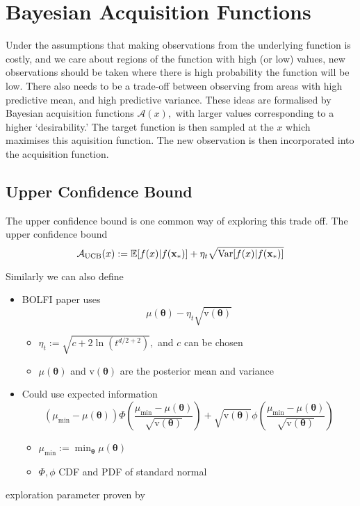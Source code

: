 \begin{figure}[htbp]
\end{figure}

\section{Bayesian Acquisition Functions}

Under the assumptions that making observations from the underlying function is
costly, and we care about regions of the function with high (or low)
values, new observations should be taken where there is high probability the
function will be low. There also needs to be a trade-off between observing from
areas with high predictive mean, and high predictive variance. These ideas are
formalised by Bayesian acquisition functions $\mathcal{A}(x),$ with larger 
values corresponding to a higher `desirability.' The target function is then 
sampled at the $x$ which maximises this aquisition function. The new 
observation is then incorporated into the acquisition function.

\subsection*{Upper Confidence Bound}

The upper confidence bound is one common way of exploring this trade off. The 
upper confidence bound
$$
    \mathcal{A}_\text{UCB}(x)
    := \operatorname{\mathbb{E}}[f(x) | f(\mathbf{x}_*)]
    + \eta_t \sqrt{\mathrm{Var}[f(x) | f(\mathbf{x}_*)]}
$$

Similarly we can also define 

\begin{itemize}
    \item BOLFI paper uses $$\mu(\bm\theta) - \eta_t\sqrt{\mathrm{v}(\bm\theta)}$$ \begin{itemize}
              \item $\eta_t:= \sqrt{c + 2\ln(t^{d/2 + 2})},$ and $c$ can be chosen
              \item $\mu(\bm\theta)$ and $\mathrm{v}(\bm\theta)$ are the posterior mean and variance
          \end{itemize}

    \item Could use expected information
          $$
              (\mu_\text{min} - \mu(\bm\theta)) \varPhi \left(
              \frac{\mu_\text{min} - \mu(\bm\theta)}{\sqrt{\mathrm{v}(\bm\theta)}}
              \right)
              + \sqrt{\mathrm{v}(\bm\theta)}\phi\left(
              \frac{\mu_\text{min} - \mu(\bm\theta)}{\sqrt{\mathrm{v}(\bm\theta)}}
              \right)
          $$
          \begin{itemize}
              \item $\mu_\text{min} := \min_{\bm{\theta}} \mu(\bm\theta)$
              \item $\varPhi, \phi$ CDF and PDF of standard normal
          \end{itemize}
\end{itemize}
exploration parameter proven by \cite{srinivas_gaussian_2010}